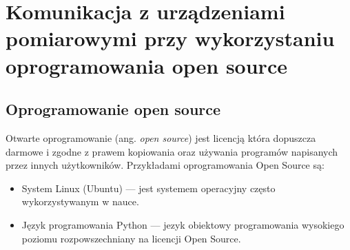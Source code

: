 \chapter{Komunikacja z urządzeniami pomiarowymi przy wykorzystaniu oprogramowania open source}
\section{Oprogramowanie open source}
Otwarte oprogramowanie (ang. \textit{open source}) jest licencją która dopuszcza darmowe i zgodne z prawem kopiowania oraz
używania programów napisanych przez innych użytkowników.
Przykładami oprogramowania Open Source są:
\begin{itemize}
\item System Linux (Ubuntu) --- jest systemem operacyjny często wykorzystywanym w nauce.
\item Język programowania Python --- jezyk obiektowy programowania wysokiego poziomu rozpowszechniany na licencji Open Source.
\end{itemize}
